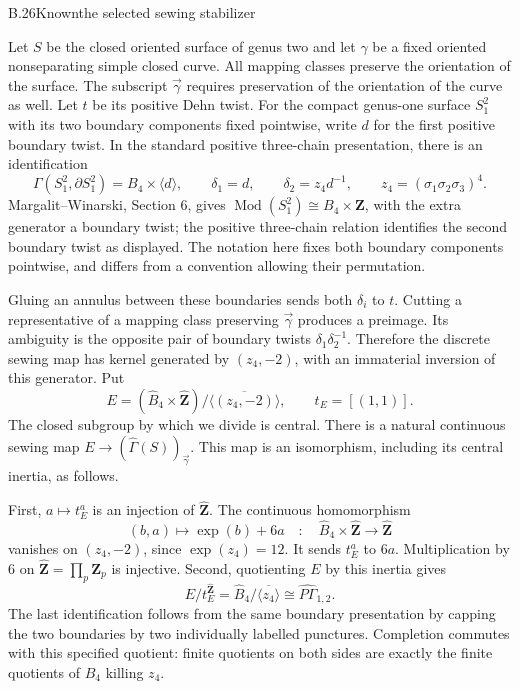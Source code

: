 \begin{statement}{B.26}{Known}{the selected sewing stabilizer}
\citep{LitBoggi2026v6,LitMargalitWinarski}
\end{statement}
Let $S$ be the closed oriented surface of genus two and let $\gamma$ be
a fixed oriented nonseparating simple closed curve. All mapping classes
preserve the orientation of the surface. The subscript $\vec\gamma$
requires preservation of the orientation of the curve as well.
Let $t$ be its positive Dehn twist. For the compact genus-one surface
$S_1^2$ with its two boundary components fixed pointwise, write $d$ for
the first positive boundary twist. In the standard positive three-chain
presentation, there is an identification
\[
 \Gamma(S_1^2,\partial S_1^2)=B_4\times\langle d\rangle,
 \qquad \delta_1=d,\qquad \delta_2=z_4d^{-1},
 \qquad z_4=(\sigma_1\sigma_2\sigma_3)^4.
\]
Margalit--Winarski, Section 6, gives $\operatorname{Mod}(S_1^2)
\cong B_4\times\mathbf Z$, with the extra generator a boundary twist;
the positive three-chain relation identifies the second boundary twist
as displayed. The notation here fixes both boundary components
pointwise, and differs from a convention allowing their permutation.

Gluing an annulus between these boundaries sends both $\delta_i$ to $t$.
Cutting a representative of a mapping class preserving $\vec\gamma$
produces a preimage. Its ambiguity is the opposite pair of boundary
twists $\delta_1\delta_2^{-1}$. Therefore the discrete sewing map has
kernel generated by $(z_4,-2)$, with an immaterial inversion of this
generator. Put
\[
 E=(\widehat B_4\times\widehat{\mathbf Z})/
       \overline{\langle(z_4,-2)\rangle},\qquad t_E=[(1,1)].
\]
The closed subgroup by which we divide is central. There is a natural
continuous sewing map $E\to(\widehat\Gamma(S))_{\vec\gamma}$.
This map is an isomorphism, including its central inertia, as follows.

First, $a\mapsto t_E^a$ is an injection of $\widehat{\mathbf Z}$.
The continuous homomorphism
\[
 (b,a)\longmapsto\operatorname{exp}(b)+6a
      \quad:\quad\widehat B_4\times\widehat{\mathbf Z}
           \longrightarrow\widehat{\mathbf Z}
\]
vanishes on $(z_4,-2)$, since $\operatorname{exp}(z_4)=12$.
It sends $t_E^a$ to $6a$. Multiplication by $6$ on
$\widehat{\mathbf Z}=\prod_p\mathbf Z_p$ is injective.
Second, quotienting $E$ by this inertia gives
\[
 E/t_E^{\widehat{\mathbf Z}}
   =\widehat B_4/\overline{\langle z_4\rangle}
   \cong\widehat{P\Gamma}_{1,2}.
\]
The last identification follows from the same boundary presentation by
capping the two boundaries by two individually labelled punctures.
Completion commutes with this specified quotient: finite quotients on
both sides are exactly the finite quotients of $B_4$ killing $z_4$.

